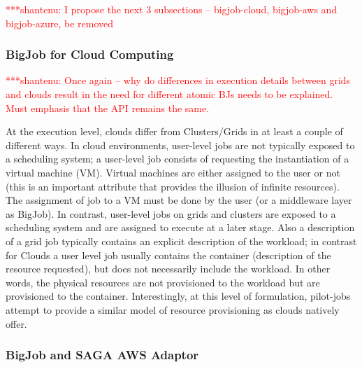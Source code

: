 \documentclass[conference,final]{IEEEtran}
\newcommand{\jhanote}[1]{ {\textcolor{red} { ***shantenu: #1 }}}
\newcommand{\alnote}[1]{ {\textcolor{blue} { ***andre: #1 }}}
\newcommand{\alnote}[1]{}
\newcommand{\jhanote}[1]{}
\begin{document}


\jhanote{I propose the next 3 subsections -- bigjob-cloud, bigjob-aws
  and bigjob-azure, be removed}

\subsubsection{BigJob for Cloud Computing}

\jhanote{Once again -- why do differences in execution details between
  grids and clouds result in the need for different atomic BJs needs
  to be explained. Must emphasis that the API remains the same.}

At the execution level, clouds differ from Clusters/Grids in at least a couple
of different ways. In cloud environments, user-level jobs are not typically
exposed to a scheduling system; a user-level job consists of requesting the
instantiation of a virtual machine (VM). Virtual machines are either assigned to
the user or not (this is an important attribute that provides the illusion of
infinite resources). The assignment of job to a VM must be done by the user (or
a middleware layer as BigJob). In contrast, user-level jobs on grids and 
clusters are exposed to a scheduling system and are
assigned to execute at a later stage. Also a description of a grid job typically
contains an explicit description of the workload; in contrast for Clouds a user
level job usually contains the container (description of the resource
requested), but does not necessarily include the workload. In other words, the
physical resources are not provisioned to the workload but are provisioned to
the container.  Interestingly, at this level of formulation, pilot-jobs attempt 
to provide a similar model of resource provisioning as clouds natively offer. 

\subsubsection{BigJob and SAGA AWS Adaptor}
\end{document}

